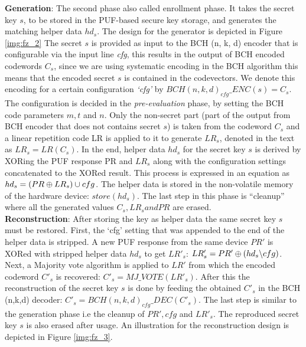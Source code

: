 \textbf{Generation}: The second phase also called enrollment phase. It takes the secret key $s$, to be stored in the PUF-based secure key storage, and generates the matching helper data $hd_s$. The design for the generator is depicted in Figure \ref{img:fz_2}  The secret $s$ is provided as input to the BCH (n, k, d) encoder that is configurable via the input line \emph{cfg}, this results in the output of BCH encoded codewords $C_s$, since we are using systematic encoding in the BCH algorithm this means that
the encoded secret $s$ is contained in the codevectors. We denote this encoding for a certain configuration \emph{`cfg'} by $BCH(n,k,d)_{cfg}\_ENC(s) = C_s$. The configuration is decided in the \emph{pre-evaluation} phase, by setting the BCH code parameters $m, t$ and $n$.
Only the non-secret part (part of the output from BCH encoder that does not contains secret $s$) is taken from the codeword $C_s$ and a linear repetition code LR is applied to it to generate $LR_s$, denoted in the text as $LR_s = LR(C_s)$. In the end, helper data $hd_s$ for the secret key $s$ is derived by XORing the PUF response PR and $LR_s$ along with the configuration settings concatenated to the XORed result. This process is expressed in an equation as $hd_s = (PR \mathbin{\oplus} LR_s) \cup cfg$.
The helper data is stored in the non-volatile memory of the hardware device: $store(hd_s)$. The last step in this phase is ``cleanup'' where all the generated values $C_s, LR_s and PR$ are erased.\\

\textbf{Reconstruction}: After storing the key as helper data the same secret key $s$ must be restored. First, the `cfg' setting that was appended to the end of the helper data is stripped. A new PUF response from the same device $PR'$ is XORed with stripped helper data $hd_s$ to get $LR'_s$: $LR'_s = PR' \mathbin{\oplus} (hd_s \backslash cfg)$. Next, a Majority vote algorithm is applied to $LR'$ from which the encoded codeword $C'_s$ is recovered: $C'_s = MJ\_VOTE(LR'_s)$. After this the
reconstruction of the secret key $s$ is done by feeding the obtained $C'_s$ in the BCH (n,k,d) decoder: $C'_s = BCH(n,k,d)_{cfg}\_DEC(C'_s)$. The last step is similar to the generation phase i.e the cleanup of $PR', cfg$ and $LR'_s$. The reproduced secret key $s$ is also erased after usage. An illustration for the reconstruction design is depicted in Figure \ref{img:fz_3}.

